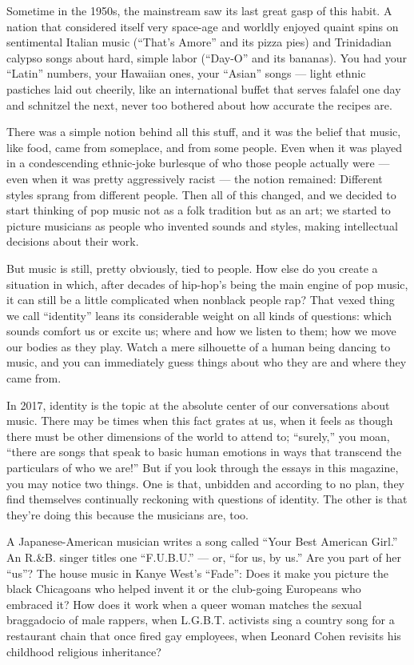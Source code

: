 Sometime in the 1950s, the mainstream saw its last great gasp of this
habit. A nation that considered itself very space-age and worldly
enjoyed quaint spins on sentimental Italian music (``That's Amore'' and
its pizza pies) and Trinidadian calypso songs about hard, simple labor
(``Day-O'' and its bananas). You had your ``Latin'' numbers, your
Hawaiian ones, your ``Asian'' songs --- light ethnic pastiches laid out
cheerily, like an international buffet that serves falafel one day and
schnitzel the next, never too bothered about how accurate the recipes
are.

There was a simple notion behind all this stuff, and it was the belief
that music, like food, came from someplace, and from some people. Even
when it was played in a condescending ethnic-joke burlesque of who those
people actually were --- even when it was pretty aggressively racist ---
the notion remained: Different styles sprang from different people. Then
all of this changed, and we decided to start thinking of pop music not
as a folk tradition but as an art; we started to picture musicians as
people who invented sounds and styles, making intellectual decisions
about their work.

But music is still, pretty obviously, tied to people. How else do you
create a situation in which, after decades of hip-hop's being the main
engine of pop music, it can still be a little complicated when nonblack
people rap? That vexed thing we call ``identity'' leans its considerable
weight on all kinds of questions: which sounds comfort us or excite us;
where and how we listen to them; how we move our bodies as they play.
Watch a mere silhouette of a human being dancing to music, and you can
immediately guess things about who they are and where they came from.

In 2017, identity is the topic at the absolute center of our
conversations about music. There may be times when this fact grates at
us, when it feels as though there must be other dimensions of the world
to attend to; ``surely,'' you moan, ``there are songs that speak to
basic human emotions in ways that transcend the particulars of who we
are!'' But if you look through the essays in this magazine, you may
notice two things. One is that, unbidden and according to no plan, they
find themselves continually reckoning with questions of identity. The
other is that they're doing this because the musicians are, too.

A Japanese-American musician writes a song called ``Your Best American
Girl.'' An R.\&B. singer titles one ``F.U.B.U.'' --- or, ``for us, by
us.'' Are you part of her ``us''? The house music in Kanye West's
``Fade'': Does it make you picture the black Chicagoans who helped
invent it or the club-going Europeans who embraced it? How does it work
when a queer woman matches the sexual braggadocio of male rappers, when
L.G.B.T. activists sing a country song for a restaurant chain that once
fired gay employees, when Leonard Cohen revisits his childhood religious
inheritance?

